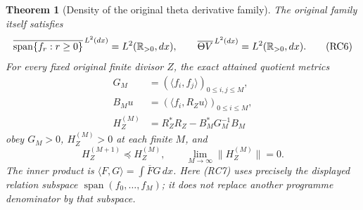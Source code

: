 \documentclass[11pt]{article}
\newtheorem{theorem}{Theorem}[section]
\begin{document}
\begin{theorem}[Density of the original theta derivative family]
The original family itself satisfies
\[
 \overline{\operatorname{span}\{f_r:r\ge0\}}^{\,L^2(dx)}
 =L^2(\mathbb R_{>0},dx),\qquad
 \overline{\Theta V}^{\,L^2(dx)}=L^2(\mathbb R_{>0},dx).
 \tag{RC6}
\]
For every fixed original finite divisor $Z$, the exact attained
quotient metrics
\[
 \begin{split}
 G_M&=(\langle f_i,f_j\rangle)_{0\le i,j\le M},\\
 B_Mu&=(\langle f_i,R_Zu\rangle)_{0\le i\le M},\\
 H_Z^{(M)}&=R_Z^*R_Z-B_M^*G_M^{-1}B_M
 \end{split}
 \tag{RC7}
\]
obey $G_M>0$, $H_Z^{(M)}>0$ at each finite $M$, and
\[
 H_Z^{(M+1)}\preceq H_Z^{(M)},\qquad
 \lim_{M\to\infty}\|H_Z^{(M)}\|=0.
 \tag{RC8}
\]
The inner product is $\langle F,G\rangle=\int\overline F G\,dx$.
Here (RC7) uses precisely the displayed relation subspace
$\operatorname{span}(f_0,\ldots,f_M)$; it does not replace another
programme denominator by that subspace.
\end{theorem}
\end{document}
